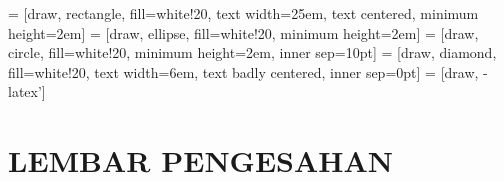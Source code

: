 \documentclass[12pt, a4paper, onecolumn, oneside, final]{report}
\theoremstyle{definition}
\numberwithin{equation}{chapter}
\begin{document}
 = [draw, rectangle, fill=white!20, text width=25em, text centered, minimum height=2em]%
 = [draw, ellipse, fill=white!20, minimum height=2em]
 = [draw, circle, fill=white!20, minimum height=2em, inner sep=10pt]
 = [draw, diamond, fill=white!20, text width=6em, text badly centered, inner sep=0pt]
 = [draw, -latex']

\pagebreak
  \chapter*{LEMBAR PENGESAHAN}

%
%
%
\pagebreak
\end{document}
